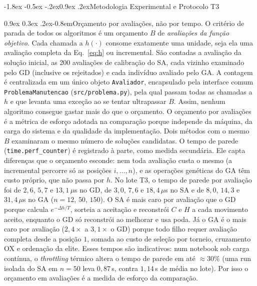 \documentclass[10pt,a4paper,twocolumn]{article}
\makeatletter
\renewcommand\section{\@startsection {section}{1}{\z@}%
  {-1.8ex \@plus -0.5ex \@minus -.2ex}{0.9ex \@plus.2ex}{\normalfont\large\bfseries}}
\renewcommand\paragraph{\@startsection{paragraph}{4}{\z@}%
  {0.9ex \@plus 0.3ex \@minus .2ex}{-0.8em}{\normalfont\normalsize\bfseries}}
\makeatother
\begin{document}
\section{Metodologia Experimental e Protocolo T3}
\label{sec:metodologia}

\paragraph{Orçamento por avaliações, não por tempo.}
O critério de parada de todos os algoritmos é um orçamento $B$ de \emph{avaliações
da função objetivo}. Cada chamada a $h(\cdot)$ consome exatamente uma unidade,
seja ela uma avaliação completa da Eq.~\eqref{eq:h} ou incremental. São contadas a
avaliação da solução inicial, as 200 avaliações de calibração do SA, cada vizinho
examinado pelo GD (inclusive os rejeitados) e cada indivíduo avaliado pelo GA. A
contagem é centralizada em um único objeto \texttt{Avaliador}, encapsulado pela
interface comum \texttt{ProblemaManutencao} (\texttt{src/problema.py}), pela qual
passam todas as chamadas a $h$ e que levanta
uma exceção ao se tentar ultrapassar $B$. Assim, nenhum algoritmo consegue gastar
mais do que o orçamento. O orçamento por avaliações é a métrica de esforço adotada na
comparação porque independe da máquina, da carga do sistema e da qualidade da
implementação. Dois métodos com o mesmo $B$ examinaram o mesmo número de soluções
candidatas. O tempo de parede (\texttt{time.perf\_counter}) é registrado à
parte, como medida secundária. Ele capta diferenças que o orçamento esconde: nem toda
avaliação custa o mesmo (a incremental percorre só as posições $i,\dots,n$), e as
operações genéticas do GA têm custo próprio, que não passa por $h$. No lote T3, o
tempo de parede por avaliação foi de $2{,}6$, $5{,}7$ e $13{,}1\,\mu$s no GD, de
$3{,}0$, $7{,}6$ e $18{,}4\,\mu$s no SA e de $8{,}0$, $14{,}3$ e $31{,}4\,\mu$s no
GA ($n=12$, $50$, $150$). O SA é mais caro por avaliação que o GD porque calcula
$e^{-\Delta h/T}$, sorteia a aceitação e reconstrói $C$ e $H$ a cada movimento aceito,
enquanto o GD só reconstrói ao melhorar e usa poda. Já o GA é o mais caro por
avaliação ($2{,}4\times$ a $3{,}1\times$ o GD) porque todo filho requer avaliação
completa desde a posição $1$, somada ao custo de seleção por torneio, cruzamento OX e
ordenação da elite. Esses tempos são indicativos:
num notebook sob carga contínua, o \emph{throttling} térmico altera o tempo de
parede em até $\approx 30\%$ (uma run isolada do SA em $n=50$ leva $0{,}87$\,s,
contra $1{,}14$\,s de média no lote). Por isso o orçamento em avaliações é a medida
de esforço da comparação.
\end{document}

